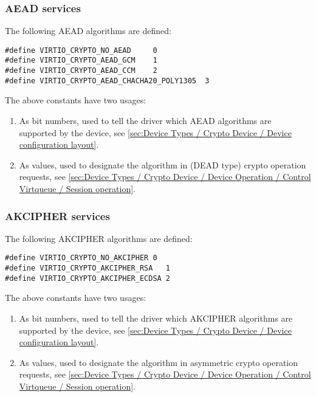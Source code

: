 \subsubsection{AEAD services}\label{sec:Device Types / Crypto Device / Supported crypto services / AEAD services}

The following AEAD algorithms are defined:

\begin{lstlisting}
#define VIRTIO_CRYPTO_NO_AEAD     0
#define VIRTIO_CRYPTO_AEAD_GCM    1
#define VIRTIO_CRYPTO_AEAD_CCM    2
#define VIRTIO_CRYPTO_AEAD_CHACHA20_POLY1305  3
\end{lstlisting}

The above constants have two usages:
\begin{enumerate}
\item As bit numbers, used to tell the driver which AEAD algorithms
are supported by the device, see \ref{sec:Device Types / Crypto Device / Device configuration layout}.
\item As values, used to designate the algorithm in (DEAD type) crypto
operation requests, see \ref{sec:Device Types / Crypto Device / Device Operation / Control Virtqueue / Session operation}.
\end{enumerate}

\subsubsection{AKCIPHER services}\label{sec: Device Types / Crypto Device / Supported crypto services / AKCIPHER services}

The following AKCIPHER algorithms are defined:
\begin{lstlisting}
#define VIRTIO_CRYPTO_NO_AKCIPHER 0
#define VIRTIO_CRYPTO_AKCIPHER_RSA   1
#define VIRTIO_CRYPTO_AKCIPHER_ECDSA 2
\end{lstlisting}

The above constants have two usages:
\begin{enumerate}
\item As bit numbers, used to tell the driver which AKCIPHER algorithms
are supported by the device, see \ref{sec:Device Types / Crypto Device / Device configuration layout}.
\item As values, used to designate the algorithm in asymmetric crypto operation requests,
see \ref{sec:Device Types / Crypto Device / Device Operation / Control Virtqueue / Session operation}.
\end{enumerate}


